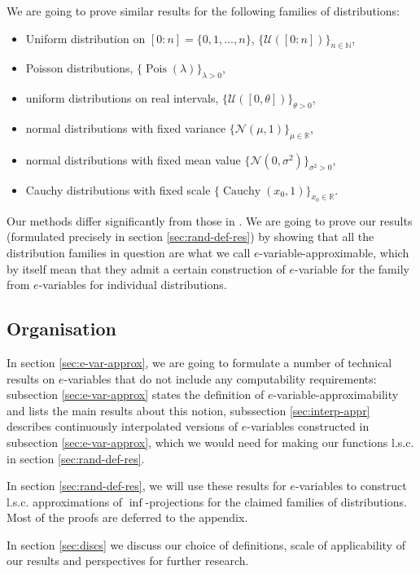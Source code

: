 \documentclass{article}
\theoremstyle{definition}
\theoremstyle{definition}
\newcommand{\natnums}{\mathbb{N}}
\newcommand{\reals}{\mathbb{R}}
\newcommand{\Pois}{\operatorname{Pois}}
\newcommand{\Cauchy}{\operatorname{Cauchy}}
\begin{document}
We are going to prove similar results for the following families of distributions: 
\begin{itemize}
    \item Uniform distribution on $[0:n]=\{0, 1, \ldots, n\}$, $\{\mathcal{U}([0:n])\}_{n\in\natnums}$,
    \item Poisson distributions, $\{\Pois(\lambda)\}_{\lambda>0}$,
    \item uniform distributions on real intervals, $\{\mathcal{U}([0,\theta])\}_{\theta > 0}$,
    \item normal distributions with fixed variance $\{\mathcal{N}(\mu,1)\}_{\mu\in\reals}$,
    \item normal distributions with fixed mean value $\{\mathcal{N}(0,\sigma^2)\}_{\sigma^2>0}$,
    \item Cauchy distributions with fixed scale $\{\Cauchy(x_0,1)\}_{x_0\in\reals}$.
\end{itemize}

Our methods differ significantly from those in \cite{VovkLearningBernoulli199796, vovk2016concept}. We are going to prove our results (formulated precisely in section \ref{sec:rand-def-res}) by showing that all the distribution families in question are what we call $e$-variable-approximable, which by itself mean that they admit a certain construction of $e$-variable for the family from $e$-variables for individual distributions.  

\subsection{Organisation}

In section \ref{sec:e-var-approx}, we are going to formulate a number of technical results on $e$-variables that do not include any computability requirements: subsection \ref{sec:e-var-approx} states the definition of $e$-variable-approximability and lists the main results about this notion, subssection \ref{sec:interp-appr} describes continuously interpolated versions of $e$-variables constructed in subsection \ref{sec:e-var-approx}, which we would need for making our functions l.s.c. in section \ref{sec:rand-def-res}. 

In section \ref{sec:rand-def-res}, we will use these results for $e$-variables to construct l.s.c. approximations of $\inf$-projections for the claimed families of distributions. Most of the proofs are deferred to the appendix. 

In section \ref{sec:discs} we discuss our choice of definitions, scale of applicability of our results and perspectives for further research.
\end{document}

